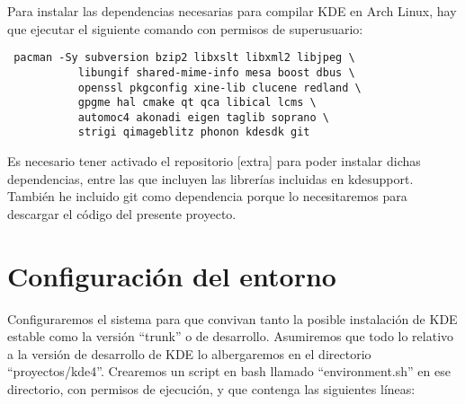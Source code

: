 Para instalar las dependencias necesarias para compilar KDE en Arch Linux, hay que ejecutar el siguiente comando con permisos de superusuario:

\begin{verbatim}
 pacman -Sy subversion bzip2 libxslt libxml2 libjpeg \
           libungif shared-mime-info mesa boost dbus \
           openssl pkgconfig xine-lib clucene redland \
           gpgme hal cmake qt qca libical lcms \
           automoc4 akonadi eigen taglib soprano \
           strigi qimageblitz phonon kdesdk git
\end{verbatim} 

Es necesario tener activado el repositorio [extra] para poder instalar dichas dependencias, entre las que incluyen las librerías incluidas en kdesupport. También he incluido git como dependencia porque lo necesitaremos para descargar el código del presente proyecto.

\section{Configuración del entorno}

Configuraremos el sistema para que convivan tanto la posible instalación de KDE estable como la versión ``trunk'' o de desarrollo. Asumiremos que todo lo relativo a la versión de desarrollo de KDE lo albergaremos en el directorio ``proyectos/kde4''. Crearemos un script en bash llamado ``environment.sh'' en ese directorio, con permisos de ejecución, y que contenga las siguientes líneas:

